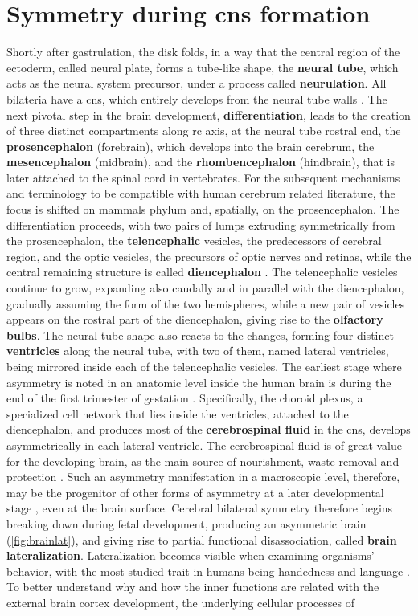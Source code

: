 \section{Symmetry during \acs{cns} formation}
Shortly after gastrulation, the disk folds, in a way that the central region of the ectoderm, called neural plate, forms a tube-like shape, the \textbf{neural tube}, which acts as the neural system precursor, under a process called \textbf{neurulation}. All bilateria have a \acf{cns}, which entirely develops from the neural tube walls \cite{F.Bear2016a}. The next pivotal step in the brain development, \textbf{differentiation}, leads to the creation of three distinct compartments along \ac{rc} axis, at the neural tube rostral end, the \textbf{prosencephalon} (forebrain), which develops into the brain cerebrum, the \textbf{mesencephalon} (midbrain), and the \textbf{rhombencephalon} (hindbrain), that is later attached to the spinal cord in vertebrates. For the subsequent mechanisms and terminology to be compatible with human cerebrum related literature, the focus is shifted on mammals phylum and, spatially, on the prosencephalon. The differentiation proceeds, with two pairs of lumps extruding symmetrically from the prosencephalon, the \textbf{telencephalic} vesicles, the predecessors of cerebral region, and the optic vesicles, the precursors of optic nerves and retinas, while the central remaining structure is called \textbf{diencephalon} \cite{F.Bear2016b}. The telencephalic vesicles continue to grow, expanding also caudally and in parallel with the diencephalon, gradually assuming the form of the two hemispheres, while a new pair of vesicles appears on the rostral part of the diencephalon, giving rise to the \textbf{olfactory bulbs}. The neural tube shape also reacts to the changes, forming four distinct \textbf{ventricles} along the neural tube, with two of them, named lateral ventricles, being mirrored inside each of the telencephalic vesicles. The earliest stage where asymmetry is noted in an anatomic level inside the human brain is during the end of the first trimester of gestation \cite{Abu-Rustum2013}. Specifically, the choroid plexus, a specialized cell network that lies inside the ventricles, attached to the diencephalon, and produces most of the \textbf{cerebrospinal fluid} in the \ac{cns},  develops asymmetrically in each lateral ventricle. The cerebrospinal fluid is of great value for the developing brain, as the main source of nourishment, waste removal and protection \cite{Telano2021}. Such an asymmetry manifestation in a macroscopic level, therefore, may be the progenitor of other forms of asymmetry at a later developmental stage \cite{Schmitz2019}, even at the brain surface. Cerebral bilateral symmetry therefore begins breaking down during fetal development, producing an asymmetric brain (\autoref{fig:brainlat}), and giving rise to partial functional disassociation, called \textbf{brain lateralization}. Lateralization becomes visible when examining organisms' behavior, with the most studied trait in humans being handedness and language \cite{Schmitz2019,Corballis2009}. To better understand why and how the inner functions are related with the external brain cortex development, the underlying cellular processes of 